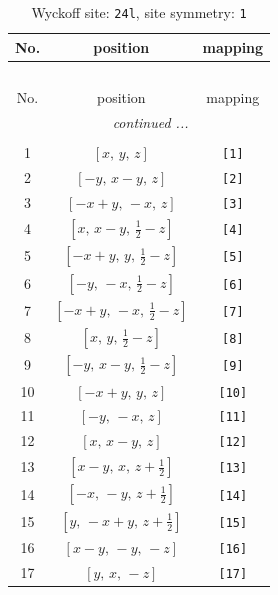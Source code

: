 \documentclass[fleqn,8pt]{jsarticle}
\begin{document}
\begin{longtable}{ccc}
\caption{Wyckoff site: {\tt 24l}, site symmetry: {\tt 1}}
 \\
 \hline \hline
No. & position & mapping \\ \hline \endfirsthead

\multicolumn{2}{l}{\tablename\ \thetable{}} \\
 \hline \hline
No. & position & mapping \\ \hline \endhead

 \hline \hline
\multicolumn{2}{r}{\footnotesize\it continued ...} \\ \endfoot

 \hline \hline
\multicolumn{2}{r}{} \\ \endlastfoot

1 & $\left[ x,\, y,\, z \right]$ & {\tt [1]} \\ \hline
2 & $\left[ - y,\, x - y,\, z \right]$ & {\tt [2]} \\ \hline
3 & $\left[ - x + y,\, - x,\, z \right]$ & {\tt [3]} \\ \hline
4 & $\left[ x,\, x - y,\, \frac{1}{2} - z \right]$ & {\tt [4]} \\ \hline
5 & $\left[ - x + y,\, y,\, \frac{1}{2} - z \right]$ & {\tt [5]} \\ \hline
6 & $\left[ - y,\, - x,\, \frac{1}{2} - z \right]$ & {\tt [6]} \\ \hline
7 & $\left[ - x + y,\, - x,\, \frac{1}{2} - z \right]$ & {\tt [7]} \\ \hline
8 & $\left[ x,\, y,\, \frac{1}{2} - z \right]$ & {\tt [8]} \\ \hline
9 & $\left[ - y,\, x - y,\, \frac{1}{2} - z \right]$ & {\tt [9]} \\ \hline
10 & $\left[ - x + y,\, y,\, z \right]$ & {\tt [10]} \\ \hline
11 & $\left[ - y,\, - x,\, z \right]$ & {\tt [11]} \\ \hline
12 & $\left[ x,\, x - y,\, z \right]$ & {\tt [12]} \\ \hline
13 & $\left[ x - y,\, x,\, z + \frac{1}{2} \right]$ & {\tt [13]} \\ \hline
14 & $\left[ - x,\, - y,\, z + \frac{1}{2} \right]$ & {\tt [14]} \\ \hline
15 & $\left[ y,\, - x + y,\, z + \frac{1}{2} \right]$ & {\tt [15]} \\ \hline
16 & $\left[ x - y,\, - y,\, - z \right]$ & {\tt [16]} \\ \hline
17 & $\left[ y,\, x,\, - z \right]$ & {\tt [17]} \\ \hline

\end{longtable}
\end{document}
